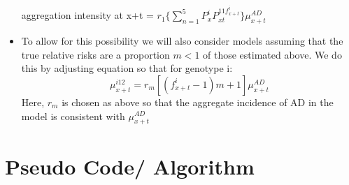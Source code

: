 \documentclass{article}
\begin{document}
\begin{itemize}
aggregation intensity at x+t = $r_1 \big\{\sum_{n=1}^{5}P_x^{i}P_{xt}^{11f_{x+t}^{i}}\big\} \mu_{x+t}^{AD} $
\item To allow for this possibility we will also consider models assuming that the true relative risks are a proportion $m<1$ of those estimated above. We do this by adjusting equation  so that for genotype i:
\[\mu_{x+t}^{i12}=r_m[(f_{x+t}^{i} - 1)m + 1]\mu_{x+t}^{AD}  \] 
Here, $r_m$  is chosen as above so that the aggregate incidence of AD in the model is consistent with $\mu_{x+t}^{AD}$





\end{itemize}



\section{Pseudo Code/ Algorithm }
\end{document}
